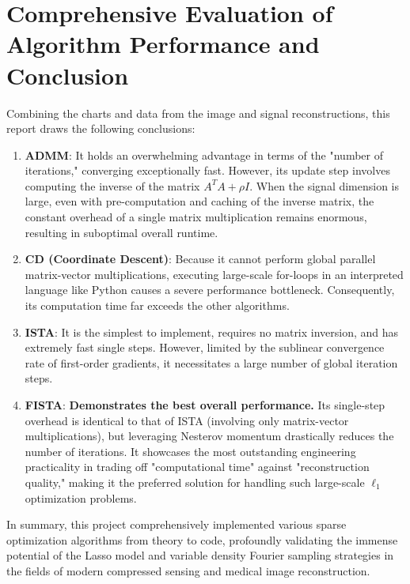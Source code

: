 \documentclass[12pt, a4paper]{article}
\begin{document}
\section{Comprehensive Evaluation of Algorithm Performance and Conclusion}
Combining the charts and data from the image and signal reconstructions, this report draws the following conclusions:
\begin{enumerate}
    \item \textbf{ADMM}: It holds an overwhelming advantage in terms of the "number of iterations," converging exceptionally fast. However, its update step involves computing the inverse of the matrix $A^TA + \rho I$. When the signal dimension is large, even with pre-computation and caching of the inverse matrix, the constant overhead of a single matrix multiplication remains enormous, resulting in suboptimal overall runtime.
    \item \textbf{CD (Coordinate Descent)}: Because it cannot perform global parallel matrix-vector multiplications, executing large-scale for-loops in an interpreted language like Python causes a severe performance bottleneck. Consequently, its computation time far exceeds the other algorithms.
    \item \textbf{ISTA}: It is the simplest to implement, requires no matrix inversion, and has extremely fast single steps. However, limited by the sublinear convergence rate of first-order gradients, it necessitates a large number of global iteration steps.
    \item \textbf{FISTA}: \textbf{Demonstrates the best overall performance.} Its single-step overhead is identical to that of ISTA (involving only matrix-vector multiplications), but leveraging Nesterov momentum drastically reduces the number of iterations. It showcases the most outstanding engineering practicality in trading off "computational time" against "reconstruction quality," making it the preferred solution for handling such large-scale $\ell_1$ optimization problems.
\end{enumerate}

In summary, this project comprehensively implemented various sparse optimization algorithms from theory to code, profoundly validating the immense potential of the Lasso model and variable density Fourier sampling strategies in the fields of modern compressed sensing and medical image reconstruction.
\end{document}
